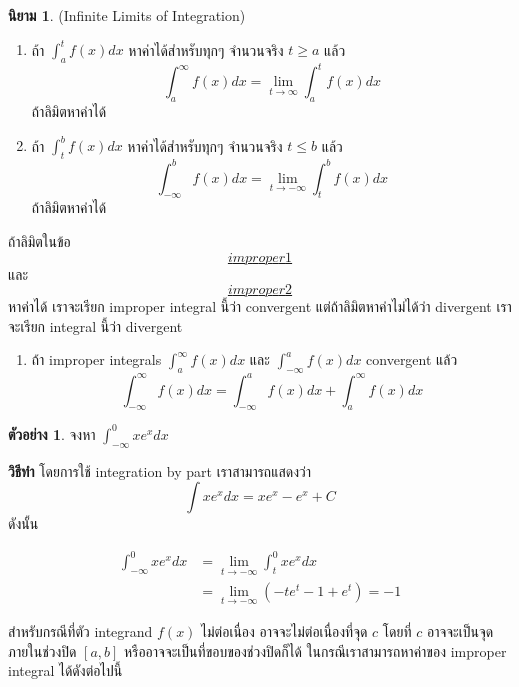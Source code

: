 \documentclass[
]{book}
\providecommand{\tightlist}{%
  \setlength{\itemsep}{0pt}\setlength{\parskip}{0pt}}
\theoremstyle{definition}
\newtheorem{definition}{นิยาม}[chapter]
\theoremstyle{definition}
\newtheorem{example}{ตัวอย่าง}[chapter]
\theoremstyle{definition}
\theoremstyle{definition}
\theoremstyle{remark}
\begin{document}
\begin{definition}

(Infinite Limits of Integration)

\begin{enumerate}
\def\labelenumi{\arabic{enumi}.}
\item
  \label{improper1}{} ถ้า \(\int_{a}^{t}f(x)dx\)
  หาค่าได้สำหรับทุกๆ จำนวนจริง \(t \ge a\) แล้ว
  \[\int_{a}^{\infty} f(x) dx  = \lim_{t \rightarrow \infty} \int_{a}^t f(x) dx\]
  ถ้าลิมิตหาค่าได้
\item
  \label{improper2}{} ถ้า \(\int_{t}^{b}f(x)dx\)
  หาค่าได้สำหรับทุกๆ จำนวนจริง \(t \le b\) แล้ว
  \[\int_{-\infty}^{b} f(x) dx  = \lim_{t \rightarrow -\infty} \int_{t}^b f(x) dx\]
  ถ้าลิมิตหาค่าได้
\end{enumerate}

ถ้าลิมิตในข้อ \hyperref[improper1]{\[improper1\]} และ
\hyperref[improper2]{\[improper2\]}
หาค่าได้ เราจะเรียก improper integral นี้ว่า convergent แต่ถ้าลิมิตหาค่าไม่ได้ว่า
divergent เราจะเรียก integral นี้ว่า divergent

\begin{enumerate}
\def\labelenumi{\arabic{enumi}.}
\setcounter{enumi}{2}
\tightlist
\item
  ถ้า improper integrals \(\int_{a}^{\infty} f(x) dx\) และ
  \(\int_{-\infty}^{a} f(x) dx\) convergent แล้ว
  \[\int_{-\infty}^{\infty} f(x) dx  = 
                \int_{-\infty}^{a} f(x) dx + \int_{a}^{\infty} f(x) dx\]
\end{enumerate}

\end{definition}

\begin{example}
จงหา \(\int_{-\infty}^0 x e^x dx\)
\end{example}

\textbf{วิธีทำ} โดยการใช้ integration by part เราสามารถแสดงว่า
\[\int x e^x dx = x e^x - e^x +C\] ดังนั้น  

\[\begin{aligned}
         \int_{-\infty}^0 x e^x dx &=  \lim_{t \rightarrow -\infty} \int_{t}^0 x e^x dx \\
                        &=  \lim_{t \rightarrow -\infty} (-t e^t -1 + e^t) = -1   
\end{aligned}\]

 

สำหรับกรณีที่ตัว integrand \(f(x)\) ไม่ต่อเนื่อง อาจจะไม่ต่อเนื่องที่จุด \(c\) โดยที่ \(c\)
อาจจะเป็นจุดภายในช่วงปิด \([a,b]\) หรืออาจจะเป็นที่ขอบของช่วงปิดก็ได้
ในกรณีเราสามารถหาค่าของ improper integral ได้ดังต่อไปนี้
\end{document}
